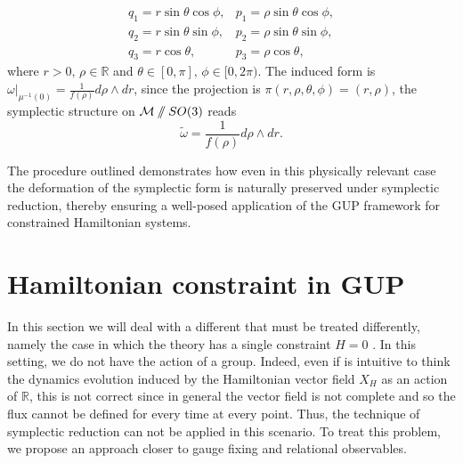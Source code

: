 \documentclass{article}
\numberwithin{equation}{section}
\theoremstyle{definition}
\newcommand{\R}{\mathbb{R}}
\newcommand{\M}{\mathcal{M}}
\newcommand{\sslash}{\mathbin{/\mkern-6mu/}}
\begin{document}
\begin{equation}
    \begin{matrix}
        q_1=r\sin\theta \cos\phi, & p_1=\rho\sin\theta \cos\phi,\\
        q_2=r\sin\theta \sin\phi, & p_2=\rho\sin\theta \sin\phi,\\
        q_3=r\cos\theta, & p_3=\rho\cos\theta,
    \end{matrix}
\end{equation}
where $r>0,\,\rho\in\R$ and $\theta\in[0,\pi],\,\phi\in[0,2\pi)$. The induced form is $\omega|_{\mu^{-1}(0)}=\frac{1}{f(\rho)}d\rho\wedge dr$, since the projection is $\pi(r,\rho,\theta,\phi)=(r,\rho)$, the symplectic structure on $\M\sslash SO(3)$ reads
\begin{equation}
    \tilde\omega =\frac{1}{f(\rho)}d\rho\wedge dr.
\end{equation}

The procedure outlined demonstrates how even in this physically relevant case the deformation of the symplectic form is naturally preserved under symplectic reduction, thereby ensuring a well-posed application of the GUP framework for constrained Hamiltonian systems.

\section{Hamiltonian constraint in GUP} \label{Sec_III}
In this section we will deal with a different that must be treated differently, namely the case in which the theory has a single constraint $H=0$ . 
In this setting, we do not have the action of a group. Indeed, even if is intuitive to think the dynamics evolution induced by the Hamiltonian vector field $X_H$ as an action of $\R$, this is not correct since in general the vector field is not complete and so the flux cannot be defined for every time at every point. Thus, the technique of symplectic reduction can not be applied in this scenario. To treat this problem, we propose an approach closer to gauge fixing and relational observables.

\medskip
\end{document}
